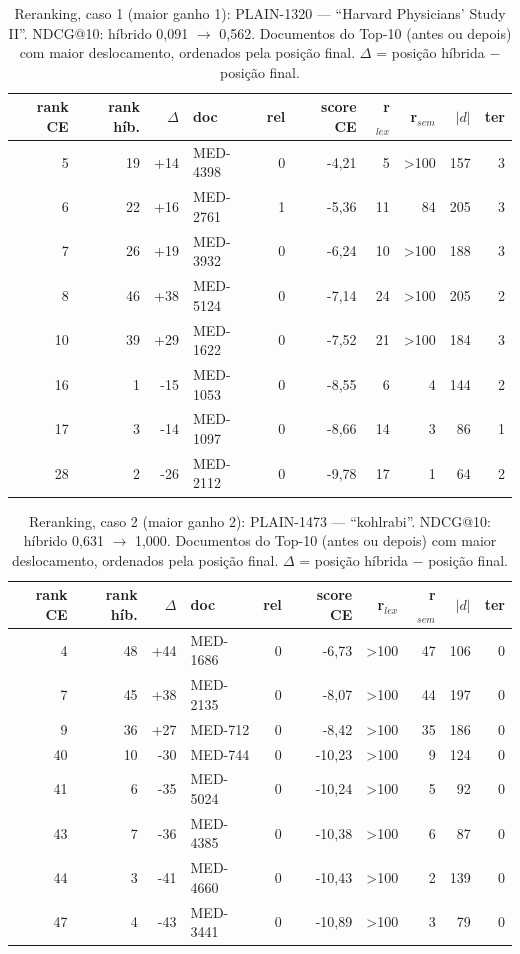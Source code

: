 \begin{table}[!htb]
\centering
\caption{Reranking, caso 1 (maior ganho 1): PLAIN-1320 --- ``Harvard Physicians' Study II''. NDCG@10: híbrido 0,091 $\rightarrow$ 0,562. Documentos do Top-10 (antes ou depois) com maior deslocamento, ordenados pela posição final. $\Delta$ = posição híbrida $-$ posição final.}
\label{tab:rr1}
\scriptsize
\begin{tabular}{rrrlrrrrrr}
\toprule
rank CE & rank híb. & $\Delta$ & doc & rel & score CE & r$_{lex}$ & r$_{sem}$ & $|d|$ & ter \\
\midrule
5 & 19 & +14 & MED-4398 & 0 & -4,21 & 5 & >100 & 157 & 3 \\
6 & 22 & +16 & MED-2761 & 1 & -5,36 & 11 & 84 & 205 & 3 \\
7 & 26 & +19 & MED-3932 & 0 & -6,24 & 10 & >100 & 188 & 3 \\
8 & 46 & +38 & MED-5124 & 0 & -7,14 & 24 & >100 & 205 & 2 \\
10 & 39 & +29 & MED-1622 & 0 & -7,52 & 21 & >100 & 184 & 3 \\
16 & 1 & -15 & MED-1053 & 0 & -8,55 & 6 & 4 & 144 & 2 \\
17 & 3 & -14 & MED-1097 & 0 & -8,66 & 14 & 3 & 86 & 1 \\
28 & 2 & -26 & MED-2112 & 0 & -9,78 & 17 & 1 & 64 & 2 \\
\bottomrule
\end{tabular}
\end{table}
\begin{table}[!htb]
\centering
\caption{Reranking, caso 2 (maior ganho 2): PLAIN-1473 --- ``kohlrabi''. NDCG@10: híbrido 0,631 $\rightarrow$ 1,000. Documentos do Top-10 (antes ou depois) com maior deslocamento, ordenados pela posição final. $\Delta$ = posição híbrida $-$ posição final.}
\label{tab:rr2}
\scriptsize
\begin{tabular}{rrrlrrrrrr}
\toprule
rank CE & rank híb. & $\Delta$ & doc & rel & score CE & r$_{lex}$ & r$_{sem}$ & $|d|$ & ter \\
\midrule
4 & 48 & +44 & MED-1686 & 0 & -6,73 & >100 & 47 & 106 & 0 \\
7 & 45 & +38 & MED-2135 & 0 & -8,07 & >100 & 44 & 197 & 0 \\
9 & 36 & +27 & MED-712 & 0 & -8,42 & >100 & 35 & 186 & 0 \\
40 & 10 & -30 & MED-744 & 0 & -10,23 & >100 & 9 & 124 & 0 \\
41 & 6 & -35 & MED-5024 & 0 & -10,24 & >100 & 5 & 92 & 0 \\
43 & 7 & -36 & MED-4385 & 0 & -10,38 & >100 & 6 & 87 & 0 \\
44 & 3 & -41 & MED-4660 & 0 & -10,43 & >100 & 2 & 139 & 0 \\
47 & 4 & -43 & MED-3441 & 0 & -10,89 & >100 & 3 & 79 & 0 \\
\bottomrule
\end{tabular}
\end{table}
